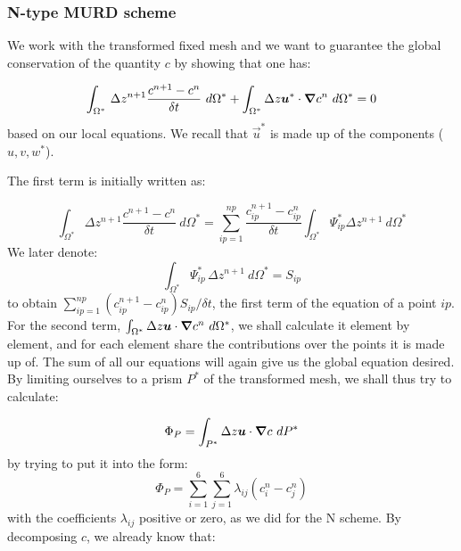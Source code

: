 \subsubsection{N-type MURD scheme}

We work with the transformed fixed mesh and we want to guarantee the global
conservation of the quantity $c$ by showing that one has:%

\begin{equation}
\int\nolimits_{\Omega^{\ast}}\,\Delta z^{n+1}\dfrac{c^{n+1}-c^{n}}{\delta t}~
d\Omega^{\ast}+\int\nolimits_{\Omega^{\ast}}\Delta z\bm{u}^{\ast}
\cdot\bm{\nabla} c^{n}~d\Omega^{\ast}=0
\end{equation}
based on our local equations. We recall that $\vec{u}^{\ast}$ is
made up of the components ($u,v,w^{\ast}$).

The first term is initially written as:%

\begin{equation}
\int\nolimits_{\Omega^{\ast}}\Delta z^{n+1}\dfrac{c^{n+1}-c^{n}}{\delta
t}~d\Omega^{\ast}=\sum\limits_{ip=1}^{np}\dfrac{c_{ip}^{n+1}-c_{ip}^{n}%
}{\delta t}\int\nolimits_{\Omega^{\ast}}\Psi_{ip}^{\ast}\Delta
z^{n+1}~d\Omega^{\ast}
\end{equation}
We later denote:
\begin{equation}
\int\nolimits_{\Omega^{\ast}}\Psi_{ip}^{\ast}\,\Delta z^{n+1}~d\Omega^{\ast
}=S_{ip}%
\end{equation}
to obtain
$\sum\nolimits_{ip=1}^{np}(c_{ip}^{n+1}-c_{ip}^{n})S_{ip}/\delta t$,
the first term of the equation of a point $ip$.
For the second term, $\int\nolimits_{\Omega^{\ast}}\Delta z\bm{u}
\cdot\bm{\nabla} c^{n}~d\Omega^{\ast}$, we
shall calculate it element by element, and for each element share the
contributions over the points it is made up of. The sum of all our equations
will again give us the global equation desired.
By limiting ourselves to a prism $P^{\ast}$ of the transformed mesh, we shall
thus try to calculate:%

\begin{equation}
\Phi_{P}=\int\nolimits_{P^{\ast}}\Delta z\bm{u}\cdot\bm{\nabla} c~dP^{\ast}
\end{equation}
by trying to put it into the form:
\begin{equation}
\Phi_{P}=\sum\limits_{i=1}^{6}\sum\limits_{j=1}^{6}\lambda_{ij}(c_{i}^{n}-c_{j}^{n})
\end{equation}
with the coefficients $\lambda_{ij}$ positive or zero, as we did for the N
scheme. By decomposing $c$, we already know that:

